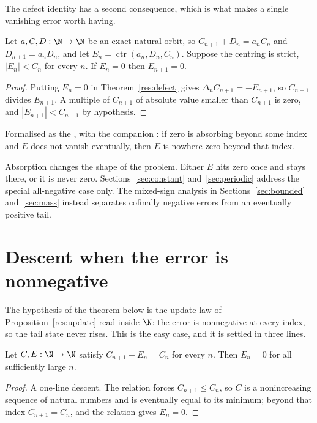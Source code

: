 \documentclass[11pt]{article}
\newcommand{\ctr}{\operatorname{ctr}}
\begin{document}
The defect identity has a second consequence, which is what makes a single
vanishing error worth having.

\begin{theorem}\label{res:absorb}
Let $a,C,D:\N\to\N$ be an exact natural orbit, so
$C_{n+1}+D_n=a_nC_n$ and $D_{n+1}=a_nD_n$, and let
$E_n=\ctr(a_n,D_n,C_n)$.  Suppose the centring is strict, $|E_n|<C_n$ for
every $n$.  If $E_n=0$ then $E_{n+1}=0$.
\end{theorem}

\begin{proof}
Putting $E_n=0$ in Theorem~\ref{res:defect} gives
$\Delta_n C_{n+1}=-E_{n+1}$, so $C_{n+1}$ divides $E_{n+1}$.  A multiple of
$C_{n+1}$ of absolute value smaller than $C_{n+1}$ is zero, and
$|E_{n+1}|<C_{n+1}$ by hypothesis.
\end{proof}

\noindent Formalised as the
, with the companion
: if zero is absorbing beyond some index and $E$ does not vanish
eventually, then $E$ is nowhere zero beyond that index.

Absorption changes the shape of the problem.  Either $E$ hits zero once and
stays there, or it is never zero.  Sections~\ref{sec:constant}
and~\ref{sec:periodic} address the special all-negative case only.  The
mixed-sign analysis
in Sections~\ref{sec:bounded} and~\ref{sec:mass} instead separates cofinally
negative errors from an eventually positive tail.

\section{Descent when the error is nonnegative}\label{sec:descent}

The hypothesis of the theorem below is the update law of
Proposition~\ref{res:update} read inside $\N$: the error is nonnegative at
every index, so the tail state never rises.  This is the easy case, and it is
settled in three lines.

\begin{theorem}[descent]\label{res:descent}
Let $C,E:\N\to\N$ satisfy $C_{n+1}+E_n=C_n$ for every $n$.  Then $E_n=0$ for
all sufficiently large $n$.
\end{theorem}

\begin{proof}
A one-line descent.  The relation forces $C_{n+1}\le C_n$, so $C$ is a nonincreasing sequence of
natural numbers and is eventually equal to its minimum; beyond that index
$C_{n+1}=C_n$, and the relation gives $E_n=0$.
\end{proof}
\end{document}
